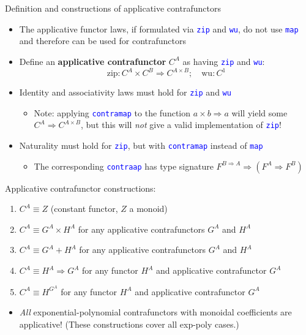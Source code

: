 \documentclass[english]{beamer}
\begin{document}
\begin{frame}{Definition and constructions of applicative contrafunctors}
\begin{itemize}
\item \vspace{-0.2cm}The applicative functor laws, if formulated via \texttt{\textcolor{blue}{\footnotesize{}zip}}
and \texttt{\textcolor{blue}{\footnotesize{}wu}}, do not use \texttt{\textcolor{blue}{\footnotesize{}map}}
and therefore can be used for contrafunctors
\item Define an \textbf{applicative contrafunctor} $C^{A}$ as having \texttt{\textcolor{blue}{\footnotesize{}zip}}
and \texttt{\textcolor{blue}{\footnotesize{}wu}}:{\footnotesize{}
\[
\text{zip}:C^{A}\times C^{B}\Rightarrow C^{A\times B};\quad\text{wu}:C^{1}
\]
}{\footnotesize \par}
\item Identity and associativity laws must hold for \texttt{\textcolor{blue}{\footnotesize{}zip}}
and \texttt{\textcolor{blue}{\footnotesize{}wu}} 
\begin{itemize}
\item Note: applying \texttt{\textcolor{blue}{\footnotesize{}contramap}}
to the function $a\times b\Rightarrow a$ will yield some $C^{A}\Rightarrow C^{A\times B}$,
but this will \emph{not} give a valid implementation of \texttt{\textcolor{blue}{\footnotesize{}zip}}!
\end{itemize}
\item Naturality must hold for \texttt{\textcolor{blue}{\footnotesize{}zip}},
but with \texttt{\textcolor{blue}{\footnotesize{}contramap}} instead
of \texttt{\textcolor{blue}{\footnotesize{}map}} 
\begin{itemize}
\item The corresponding \texttt{\textcolor{blue}{\footnotesize{}contraap}}
has type signature $F^{B\Rightarrow A}\Rightarrow(F^{A}\Rightarrow F^{B})$ 
\end{itemize}
\end{itemize}
Applicative contrafunctor constructions:
\begin{enumerate}
\item $C^{A}\equiv Z$ (constant functor, $Z$ a monoid)
\item $C^{A}\equiv G^{A}\times H^{A}$ for any applicative contrafunctors
$G^{A}$ and $H^{A}$
\item $C^{A}\equiv G^{A}+H^{A}$ for any applicative contrafunctors $G^{A}$
and $H^{A}$
\item $C^{A}\equiv H^{A}\Rightarrow G^{A}$ for any functor $H^{A}$ and
applicative contrafunctor $G^{A}$
\item $C^{A}\equiv H^{G^{A}}$ for any functor $H^{A}$ and applicative
contrafunctor $G^{A}$
\end{enumerate}
\begin{itemize}
\item \emph{All} exponential-polynomial contrafunctors with monoidal coefficients
are applicative! (These constructions cover all exp-poly cases.)
\end{itemize}
\end{frame}
\end{document}
